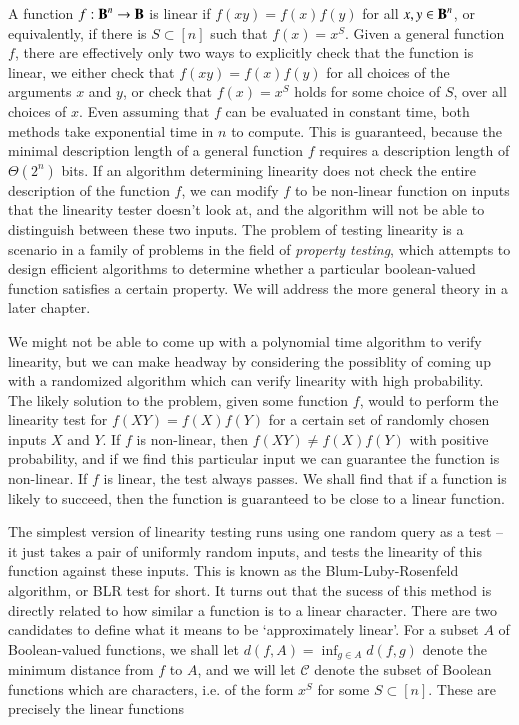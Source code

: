 A function $f: \operatorname{\mathbf{B}}^n \to \operatorname{\mathbf{B}}$ is linear if $f(xy) = f(x) f(y)$ for all $x,y \in \operatorname{\mathbf{B}}^n$, or equivalently, if there is $S \subset [n]$ such that $f(x) = x^S$. Given a general function $f$, there are effectively only two ways to explicitly check that the function is linear, we either check that $f(xy) = f(x) f(y)$ for all choices of the arguments $x$ and $y$, or check that $f(x) = x^S$ holds for some choice of $S$, over all choices of $x$. Even assuming that $f$ can be evaluated in constant time, both methods take exponential time in $n$ to compute. This is guaranteed, because the minimal description length of a general function $f$ requires a description length of $\Theta(2^n)$ bits. If an algorithm determining linearity does not check the entire description of the function $f$, we can modify $f$ to be non-linear function on inputs that the linearity tester doesn't look at, and the algorithm will not be able to distinguish between these two inputs. The problem of testing linearity is a scenario in a family of problems in the field of \emph{property testing}, which attempts to design efficient algorithms to determine whether a particular boolean-valued function satisfies a certain property. We will address the more general theory in a later chapter.

We might not be able to come up with a polynomial time algorithm to verify linearity, but we can make headway by considering the possiblity of coming up with a randomized algorithm which can verify linearity with high probability. The likely solution to the problem, given some function $f$, would to perform the linearity test for $f(XY) = f(X) f(Y)$ for a certain set of randomly chosen inputs $X$ and $Y$. If $f$ is non-linear, then $f(XY) \neq f(X) f(Y)$ with positive probability, and if we find this particular input we can guarantee the function is non-linear. If $f$ is linear, the test always passes. We shall find that if a function is likely to succeed, then the function is guaranteed to be close to a linear function.

The simplest version of linearity testing runs using one random query as a test -- it just takes a pair of uniformly random inputs, and tests the linearity of this function against these inputs. This is known as the Blum-Luby-Rosenfeld algorithm, or BLR test for short. It turns out that the sucess of this method is directly related to how similar a function is to a linear character. There are two candidates to define what it means to be `approximately linear'. For a subset $A$ of Boolean-valued functions, we shall let $d(f,A) = \inf_{g \in A} d(f,g)$ denote the minimum distance from $f$ to $A$, and we will let $\mathcal{C}$ denote the subset of Boolean functions which are characters, i.e. of the form $x^S$ for some $S \subset [n]$. These are precisely the linear functions 

